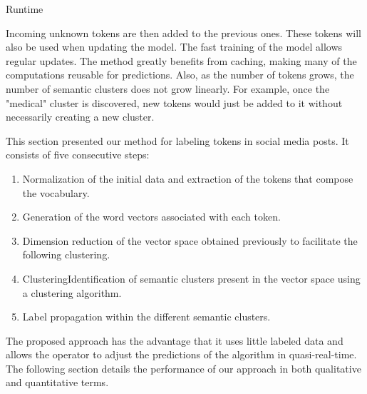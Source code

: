 \begin{algorithm}[htb]
    \DontPrintSemicolon
    \caption{Runtime\label{alg:inference}}
\end{algorithm}

Incoming unknown tokens are then added to the previous ones.
These tokens will also be used when updating the model.
The fast training of the model allows regular updates.
The method greatly benefits from caching, making many of the computations reusable for predictions.
Also, as the number of tokens grows, the number of semantic clusters does not grow linearly.
For example, once the "medical" cluster is discovered, new tokens would just be added to it without necessarily creating a new cluster.

This section presented our method for labeling tokens in social media posts.
It consists of five consecutive steps:
\begin{enumerate}
    \item Normalization of the initial data and extraction of the tokens that compose the vocabulary.
    \item Generation of the word vectors associated with each token.
    \item Dimension reduction of the vector space obtained previously to facilitate the following clustering.
    \item ClusteringIdentification of semantic clusters present in the vector space using a clustering algorithm.
    \item Label propagation within the different semantic clusters.
\end{enumerate}
The proposed approach has the advantage that it uses little labeled data and allows the
operator to adjust the predictions of the algorithm in quasi-real-time.
The following section details the performance of our approach in both qualitative and quantitative terms.

